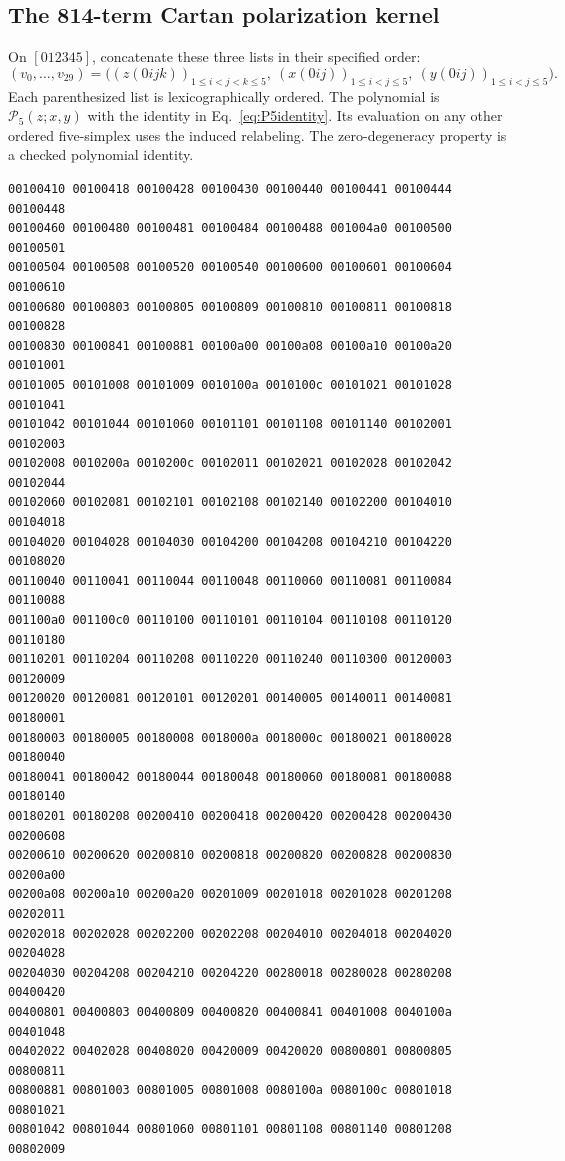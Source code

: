 \subsection{The 814-term Cartan polarization kernel}
On $[012345]$, concatenate these three lists in their specified order:
\begin{equation}
(v_0,\ldots,v_{29})=
\bigl((z(0ijk))_{1\le i<j<k\le5},\ (x(0ij))_{1\le i<j\le5},\ (y(0ij))_{1\le i<j\le5}\bigr).
\end{equation}
Each parenthesized list is lexicographically ordered. The polynomial is $\mathcal P_5(z;x,y)$ with the identity in Eq.~\eqref{eq:P5identity}. Its evaluation on any other ordered five-simplex uses the induced relabeling. The zero-degeneracy property is a checked polynomial identity.
\begin{Verbatim}[fontsize=\scriptsize]
00100410 00100418 00100428 00100430 00100440 00100441 00100444 00100448
00100460 00100480 00100481 00100484 00100488 001004a0 00100500 00100501
00100504 00100508 00100520 00100540 00100600 00100601 00100604 00100610
00100680 00100803 00100805 00100809 00100810 00100811 00100818 00100828
00100830 00100841 00100881 00100a00 00100a08 00100a10 00100a20 00101001
00101005 00101008 00101009 0010100a 0010100c 00101021 00101028 00101041
00101042 00101044 00101060 00101101 00101108 00101140 00102001 00102003
00102008 0010200a 0010200c 00102011 00102021 00102028 00102042 00102044
00102060 00102081 00102101 00102108 00102140 00102200 00104010 00104018
00104020 00104028 00104030 00104200 00104208 00104210 00104220 00108020
00110040 00110041 00110044 00110048 00110060 00110081 00110084 00110088
001100a0 001100c0 00110100 00110101 00110104 00110108 00110120 00110180
00110201 00110204 00110208 00110220 00110240 00110300 00120003 00120009
00120020 00120081 00120101 00120201 00140005 00140011 00140081 00180001
00180003 00180005 00180008 0018000a 0018000c 00180021 00180028 00180040
00180041 00180042 00180044 00180048 00180060 00180081 00180088 00180140
00180201 00180208 00200410 00200418 00200420 00200428 00200430 00200608
00200610 00200620 00200810 00200818 00200820 00200828 00200830 00200a00
00200a08 00200a10 00200a20 00201009 00201018 00201028 00201208 00202011
00202018 00202028 00202200 00202208 00204010 00204018 00204020 00204028
00204030 00204208 00204210 00204220 00280018 00280028 00280208 00400420
00400801 00400803 00400809 00400820 00400841 00401008 0040100a 00401048
00402022 00402028 00408020 00420009 00420020 00800801 00800805 00800811
00800881 00801003 00801005 00801008 0080100a 0080100c 00801018 00801021
00801042 00801044 00801060 00801101 00801108 00801140 00801208 00802009

\end{Verbatim}
